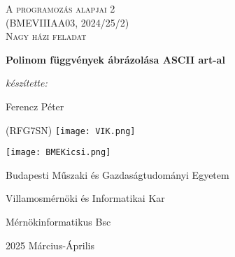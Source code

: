 \begin{titlepage}
    \centering
    \vspace{1cm}
    {\Large \textsc{A programozás alapjai 2\\(BMEVIIIAA03, 2024/25/2)\\  Nagy házi feladat}\par}
    \vspace{1.5cm}
    {\huge\bfseries Polinom függvények ábrázolása ASCII art-al\par}
    \vspace{2cm}
    {\Large\itshape készítette: \par Ferencz Péter\par}
    {\large(RFG7SN)}
    \vfill
    \texttt{[image: VIK.png]}\par
    \vspace{1cm}
    \texttt{[image: BMEKicsi.png]}\par
    Budapesti Műszaki és Gazdaságtudományi Egyetem\par
    Villamosmérnöki és Informatikai Kar\par
    Mérnökinformatikus Bsc\par
    {\large 2025 Március-Április\par}
\end{titlepage}